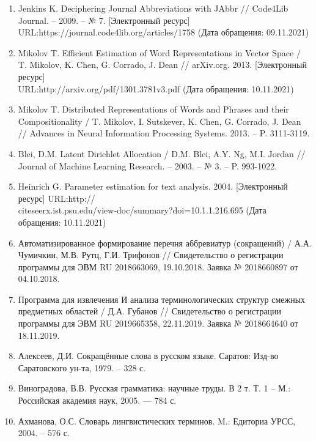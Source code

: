 \documentclass{article}
\begin{document}
\begin{enumerate}
    \item Jenkins K. Deciphering Journal Abbreviations with JAbbr // Code4Lib Journal. – 2009. – № 7. [Электронный ресурс] URL:https://journal.code4lib.org/articles/1758 (Дата обращения: 09.11.2021)
    \item Mikolov T. Efficient Estimation of Word Representations in Vector Space / T. Mikolov, K. Chen, G. Corrado, J. Dean // arXiv.org. 2013. [Электронный ресурс] \\URL:http://arxiv.org/pdf/1301.3781v3.pdf (Дата обращения: 10.11.2021)
    \item Mikolov T. Distributed Representations of Words and Phrases and their Compositionality / T. Mikolov, I. Sutskever, K. Chen, G. Corrado, J. Dean // Advances in Neural Information Processing Systems. 2013. – P. 3111-3119.
    \item Blei, D.M. Latent Dirichlet Allocation / D.M. Blei, A.Y. Ng, M.Ι. Jordan // Journal of Machine Learning Research. – 2003. – № 3. – P. 993-1022.
    \item Heinrich G. Parameter estimation for text analysis. 2004. [Электронный ресурс] URL:http://\\citeseerx.ist.psu.edu/view-doc/summary?doi=10.1.1.216.695 (Дата обращения: 10.11.2021)
    \item Автоматизированное формирование перечня аббревиатур (сокращений) / А.А. Чумичкин, М.В. Рутц, Г.И. Трифонов // Свидетельство о регистрации программы для ЭВМ RU 2018663069, 19.10.2018. Заявка № 2018660897 от 04.10.2018.
    \item Программа для извлечения И анализа терминологических структур смежных предметных областей / Д.А. Губанов // Свидетельство о регистрации программы для ЭВМ RU 2019665358, 22.11.2019. Заявка № 2018664640 от 18.11.2019.
    \item Алексеев, Д.И. Сокращённые слова в русском языке. Саратов: Изд-во Саратовского ун-та, 1979. – 328 с.
    \item Виноградова, В.В. Русская грамматика: научные труды. В 2 т. Т. 1 – М.: Российская академия наук, 2005. — 784 с.
    \item Ахманова, О.С. Словарь лингвистических терминов. Μ.: Едиториа УРСС, 2004. – 576 с.
\end{enumerate}
\end{document}
